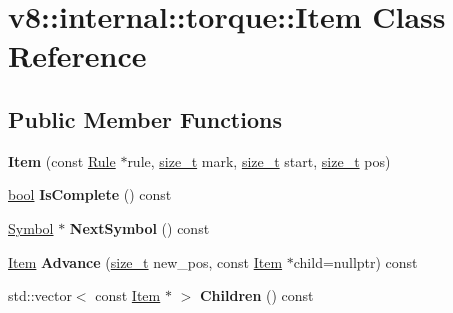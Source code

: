 \hypertarget{classv8_1_1internal_1_1torque_1_1Item}{}\section{v8\+:\+:internal\+:\+:torque\+:\+:Item Class Reference}
\label{classv8_1_1internal_1_1torque_1_1Item}
\subsection*{Public Member Functions}
\begin{DoxyCompactItemize}
\item 
\mbox{\label{classv8_1_1internal_1_1torque_1_1Item_a6bd67a3d12ed8a341d7207bc2a885cd7}} 
{\bfseries Item} (const \mbox{\hyperlink{classv8_1_1internal_1_1torque_1_1Rule}{Rule}} $\ast$rule, \mbox{\hyperlink{classsize__t}{size\+\_\+t}} mark, \mbox{\hyperlink{classsize__t}{size\+\_\+t}} start, \mbox{\hyperlink{classsize__t}{size\+\_\+t}} pos)
\item 
\mbox{\label{classv8_1_1internal_1_1torque_1_1Item_a9cd7ae97ade0ec28414df549da12910a}} 
\mbox{\hyperlink{classbool}{bool}} {\bfseries Is\+Complete} () const
\item 
\mbox{\label{classv8_1_1internal_1_1torque_1_1Item_a6947c34ba20725f101e13312d1f06f46}} 
\mbox{\hyperlink{classv8_1_1internal_1_1torque_1_1Symbol}{Symbol}} $\ast$ {\bfseries Next\+Symbol} () const
\item 
\mbox{\label{classv8_1_1internal_1_1torque_1_1Item_a6bbf87383913f70ae01d695ce4387bc1}} 
\mbox{\hyperlink{classv8_1_1internal_1_1torque_1_1Item}{Item}} {\bfseries Advance} (\mbox{\hyperlink{classsize__t}{size\+\_\+t}} new\+\_\+pos, const \mbox{\hyperlink{classv8_1_1internal_1_1torque_1_1Item}{Item}} $\ast$child=nullptr) const
\item 
\mbox{\label{classv8_1_1internal_1_1torque_1_1Item_aa70b3405d9e8901e17f4288cd6a7a336}} 
std\+::vector$<$ const \mbox{\hyperlink{classv8_1_1internal_1_1torque_1_1Item}{Item}} $\ast$ $>$ {\bfseries Children} () const
\item 

\end{DoxyCompactItemize}
